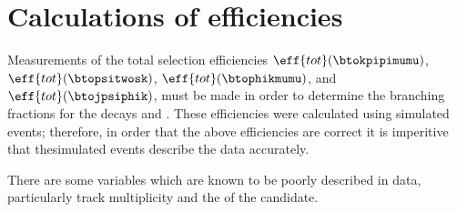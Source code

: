 \section{Calculations of efficiencies}
Measurements of the total selection efficiencies
$\eff{tot}(\btokpipimumu)$,
$\eff{tot}(\btopsitwosk)$,
$\eff{tot}(\btophikmumu)$, and
$\eff{tot}(\btojpsiphik)$,
must be made in order to determine the branching fractions for the decays \btokpipimumu and
\btophikmumu.
These efficiencies were calculated using simulated events; therefore, in order that the above
efficiencies are correct it is imperitive that thesimulated events describe the data accurately.

There are some variables which are known to be poorly described in data, particularly track
multiplicity and the \chisqvtx of the \Bp candidate.








